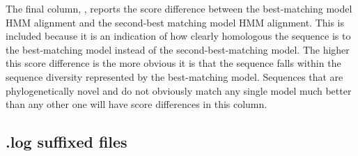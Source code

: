 The final column, , reports the score difference between
the best-matching model HMM alignment and the second-best matching
model HMM alignment. This is included because it is an indication of
how clearly homologous the sequence is to the best-matching model
instead of the second-best-matching model. The higher this score
difference is the more obvious it is that the sequence falls within
the sequence diversity represented by the best-matching model.
Sequences that are phylogenetically novel and do not obviously match
any single model much better than any other one will have score
differences in this column.

\subsection{.log suffixed files}
